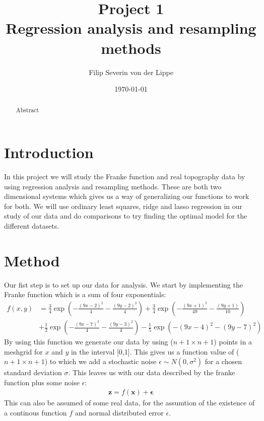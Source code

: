 \documentclass[12pt]{article}
\title{Project 1\\ Regression analysis and resampling methods}
\author{Filip Severin von der Lippe}
\date{\today}
\begin{document}
\maketitle
\begin{abstract}
  Abstract
\end{abstract}
\newpage
\tableofcontents
\section{Introduction}
In this project we will study the Franke function and real topography data by using regression analysis and resampling methods. These are both two dimensional systems which gives us a way of generalizing our functions to work for both. We will use ordinary least squares, ridge and lasso regression in our study of our data and do comparisons to try finding the optimal model for the different datasets.
\section{Method}
Our fist step is to set up our data for analysis. We start by implementing the Franke function which is a sum of four exponentials:
\begin{align*}
  f(x,y) &= \frac{3}{4 }\exp\left(- \frac{(9x -2 )^2}{4} - \frac{(9y-2)^2}{4}\right) +\frac{3}{4}\exp{\left(-\frac{(9x+1)^2}{49}- \frac{(9y+1)}{10}\right)} \\
&+\frac{1}{2}\exp{\left(-\frac{(9x-7)^2}{4} - \frac{(9y-3)^2}{4}\right)} -\frac{1}{5}\exp{\left( -(9x-4)^2 - (9y-7)^2\right) }
\end{align*}
By using this function we generate our data by using ($n+1\times n+1$) points in a meshgrid for $x$ and $y$ in the interval [0,1]. This gives us a function value of ($n+1 \times n+1$) to which we add a stochastic noise $\epsilon \sim N(0,\sigma^2)$ for a chosen standard deviation $\sigma$. This leaves us with our data described by the franke function plus some noise $\epsilon$:
\begin{align*}
  \boldsymbol{z} = f(\boldsymbol{x}) + \boldsymbol{\epsilon}
\end{align*}
This can also be assumed of some real data, for the assumtion of the existence of a continous function $f$ and normal distributed error $\epsilon$.
\end{document}
